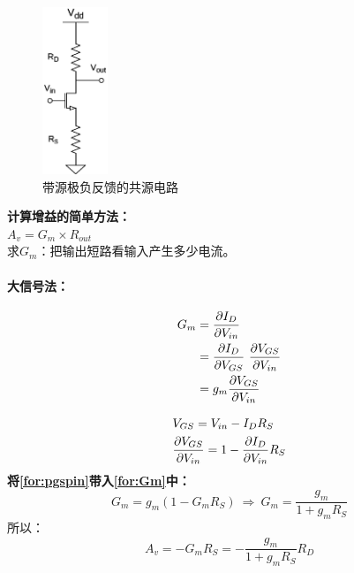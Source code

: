 \documentclass[twoside,a4paper,openright,titlepage,draft]{ctexrep}
\begin{document}
\begin{multicols}{2}
    \begin{figure}[H]
        \centering
        \includegraphics[height=50mm]{sourcedegeneration.eps}
        \caption{带源极负反馈的共源电路}
        \label{fig:带源极负反馈的共源电路}    
    \end{figure}
    \columnbreak
    \textbf{计算增益的简单方法：}\\
    $A_v = G_m \times R_{out}$\\
    求$G_m$：把输出短路看输入产生多少电流。\par
    \paragraph{大信号法：}
    \begin{align}
        G_m &= \frac{\partial I_D}{\partial V_{in}} \notag \\
        &= \frac{\partial I_D}{\partial V_{GS}}\ \frac{\partial V_{GS}}{\partial V_{in}}\notag \\
        &= g_m\frac{\partial V_{GS}}{\partial V_{in}}
        \label{for:Gm}
    \end{align}     
\end{multicols}

\par
\begin{align}
    &V_{GS} = V_{in} - I_DR_S \notag \\
    &\frac{\partial V_{GS}}{\partial V_{in}} = 1 - \frac{\partial I_D}{\partial V_{in}}R_S
    \label{for:pgspin}
\end{align}
\textbf{将\ref{for:pgspin}带入\ref{for:Gm}中：}
\begin{equation}
    G_m = g_m(1 - G_mR_S)\ \Rightarrow \ G_m = \frac{g_m}{1 + g_mR_S}
\end{equation}
所以：\\
\begin{equation}
    A_v = -G_mR_S = -\frac{g_m}{1 + g_mR_S}R_D
\end{equation}
\end{document}

